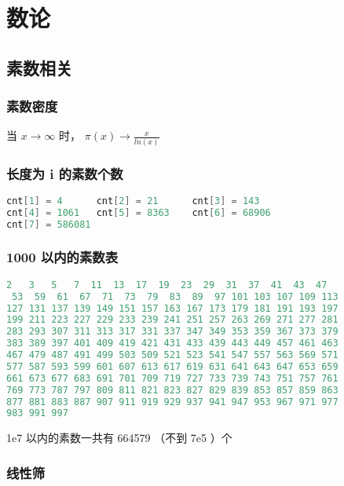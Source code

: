 

\section{数论}

\subsection{素数相关}

\subsubsection{素数密度}

当 $x \to \infty$ 时， $\pi (x) \to \frac{x}{ln(x)}$

\subsubsection{长度为 i 的素数个数 }

\begin{lstlisting}[language=C++]
cnt[1] = 4      cnt[2] = 21      cnt[3] = 143
cnt[4] = 1061   cnt[5] = 8363    cnt[6] = 68906
cnt[7] = 586081
\end{lstlisting}

\subsubsection{1000 以内的素数表}

\begin{lstlisting}[language=C++]
  2   3   5   7  11  13  17  19  23  29  31  37  41  43  47
 53  59  61  67  71  73  79  83  89  97 101 103 107 109 113
127 131 137 139 149 151 157 163 167 173 179 181 191 193 197
199 211 223 227 229 233 239 241 251 257 263 269 271 277 281
283 293 307 311 313 317 331 337 347 349 353 359 367 373 379
383 389 397 401 409 419 421 431 433 439 443 449 457 461 463
467 479 487 491 499 503 509 521 523 541 547 557 563 569 571
577 587 593 599 601 607 613 617 619 631 641 643 647 653 659
661 673 677 683 691 701 709 719 727 733 739 743 751 757 761
769 773 787 797 809 811 821 823 827 829 839 853 857 859 863
877 881 883 887 907 911 919 929 937 941 947 953 967 971 977
983 991 997
\end{lstlisting}

1e7 以内的素数一共有 664579 （不到 7e5 ）个

\subsubsection{线性筛}

